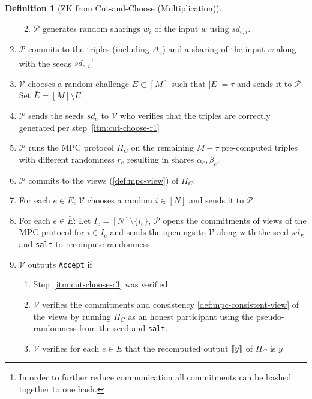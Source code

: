 \documentclass[twoside,11pt]{report}
\theoremstyle{definition}
\newtheorem{definition}{Definition}[section]
\theoremstyle{plain}
\begin{document}
\begin{definition}[ZK from Cut-and-Choose (Multiplication)]
\begin{enumerate}[itemsep=0pt, parsep=0pt]
\begin{enumerate}[nolistsep]
\begin{enumerate}
            \end{enumerate}
      \item $\mathcal{P}$ generates random sharings $w_i$ of the input $w$ using $sd_{e,i}$.
    \end{enumerate}
    \item $\mathcal{P}$ commits to the triples (including $\Delta_e$) and a sharing of the input $w$ along with the seeds $sd_{e,i}$\footnote{In order to further reduce communication all commitments can be hashed together to one hash.}
    \item $\mathcal{V}$ chooses a random challenge $E \subset [M]$ such that $|E| = \tau$ and sends it to $\mathcal{P}$. Set $\bar{E} = [M] \setminus E$
          \item\label{itm:cut-choose-r3} $\mathcal{P}$ sends the seeds $sd_e$ to $\mathcal{V}$ who verifies that the triples are correctly generated per step~\ref{itm:cut-choose-r1}
    \item $\mathcal{P}$ runs the MPC protocol $\Pi_C$ on the remaining $M-\tau$ pre-computed triples with different randomness $r_e$ resulting in shares $\alpha_e, \beta_e$.
    \item $\mathcal{P}$ commits to the views (\autoref{def:mpc-view}) of $\Pi_C$.
    \item For each $e \in \bar{E}$, $\mathcal{V}$ chooses a random $i \in [N]$ and sends it to $\mathcal{P}$.
    \item For each $e \in \bar{E}$: Let $I_e = [N] \setminus \{i_e\}$, $\mathcal{P}$ opens the commitments of views of the MPC protocol for $i \in I_e$ and sends the openings to $\mathcal{V}$ along with the seed $sd_{\bar{E}}$ and \texttt{salt} to recompute randomness.
    \item $\mathcal{V}$ outputs \texttt{Accept} if
          \begin{enumerate}[nolistsep]
            \item Step~\ref{itm:cut-choose-r3} was verified
            \item $\mathcal{V}$ verifies the commitments and consistency \autoref{def:mpc-consistent-view} of the views by running $\Pi_C$ as an honest participant using the pseudo-randomness from the seed and \texttt{salt}.
            \item $\mathcal{V}$ verifies for each $e \in \bar{E}$ that the recomputed output $\llbracket y \rrbracket$ of $\Pi_C$ is $y$
          \end{enumerate}
  \end{enumerate}
\end{definition}
\end{document}
